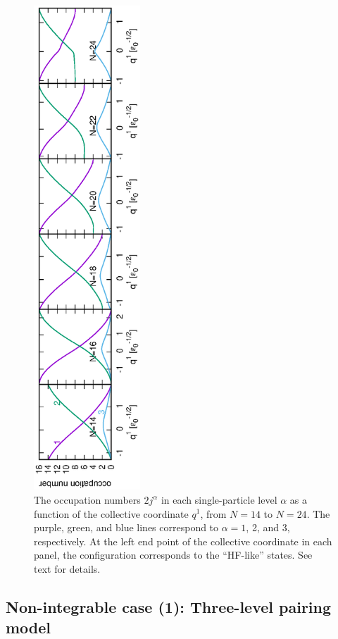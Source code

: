 \documentclass[11pt]{book} %
\begin{document}
\begin{figure}[tb]
 \begin{center}
  \includegraphics[width=40mm,angle=-90]{images/occ_number.eps}
 \end{center}
\caption{The occupation numbers $2j^{\alpha}$ in each single-particle level $\alpha$
as a function of the collective coordinate $q^1$,
from $N=14$ to $N=24$.
The purple, green, and blue lines correspond to
$\alpha=1$, 2, and 3, respectively.
At the left end point of the collective coordinate in each panel,
the configuration corresponds to the ``HF-like'' states.
See text for details.
}
 \label{occ_number}
\end{figure}
\subsection{Non-integrable case (1): Three-level pairing model}
\label{sec:three-level-model}
\end{document}
